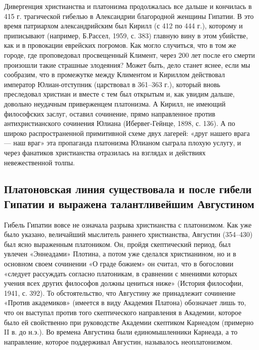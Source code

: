 Дивергенция  христианства  и  платонизма  продолжалась  все  дальше  и
кончилась  в  415 г.  трагической  гибелью  в Александрии  благородной
женщины Гипатии. В это время  патриархом александрийским был Кирилл (с
412 по 444  г.), которому и приписывают (например,  Б.Рассел, 1959, с.
383)  главную вину  в  этом  убийстве, как  и  в провокации  еврейских
погромов. Как могло  случиться, что в том же  городе, где проповедовал
просвещенный  Климент,  через  200  лет  после  его  смерти  произошли
такие  страшные злодеяния?  Может  быть, дело  станет  яснее, если  мы
сообразим,  что в  промежутке  между Климентом  и Кириллом  действовал
император Юлиан-отступник  (царствовал в  361--363 г.),  который вновь
преследовал христиан и вместе с тем был открытым и, как увидим дальше,
довольно  неудачным  приверженцем  платонизма. А  Кирилл,  не  имеющий
философских  заслуг,  оставил  сочинение,  прямо  направленное  против
антихристианского сочинения  Юлиана (Ибервег-Гейнце, 1898, с.  136). А
по  широко  распространенной  примитивной схеме  двух  лагерей:  «друг
нашего врага ---  наш враг» эта пропаганда  платонизма Юлианом сыграла
плохую услугу, и через фанатиков христианства отразилась на взглядах и
действиях невежественной толпы.

\subsection{Платоновская линия  существовала и после гибели  Гипатии и
выражена талантливейшим Августином}

Гибель Гипатии  вовсе не означала разрыва  христианства с платонизмом.
Как  уже  было  указано, величайший  мыслитель  раннего  христианства,
Августин  (354--430)  был  ясно   выраженным  платоником.  Он,  пройдя
скептический  период, был  увлечен  «Эннеадами» Плотина,  а потом  уже
сделался  христианином,  но и  в  основном  своем сочинении  «О  граде
божием»  он  считал, что  в  богословии  «следует рассуждать  согласно
платоникам,  в  сравнении  с   мнениями  которых  учения  всех  других
философов  должны цениться  ниже» (История  философии, 1941,  с. 392).
То  обстоятельство, что  Августину  же  принадлежит сочинение  «Против
академиков» (имеется в виду Академия  Платона) обозначает лишь то, что
он выступал против того  скептического направления в Академии, которое
было  ей  свойственно  при руководстве  Академии  скептиком  Карнеадом
(примерно II  в. до н.э.).  Во времена Августина  были единомышленники
Карнеада, а  то направление, которое поддерживал  Августин, называлось
неоплатонизмом.

